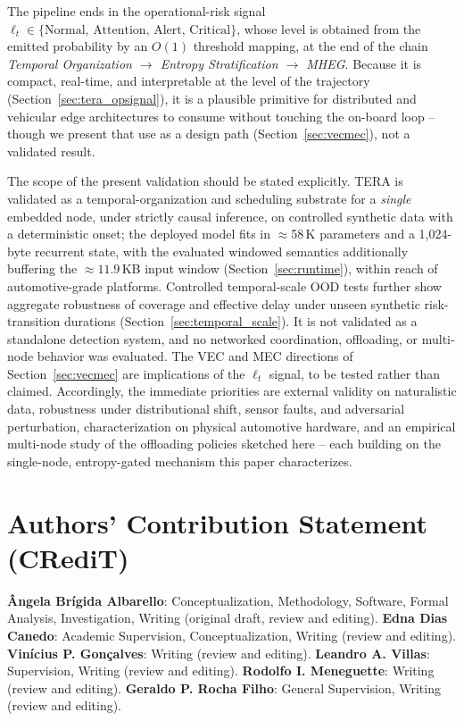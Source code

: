 \documentclass[a4paper,fleqn]{cas-dc}
\begin{document}
The pipeline ends in the operational-risk signal
$\ell_t \in \{\text{Normal},\, \text{Attention},\, \text{Alert},\, \text{Critical}\}$,
{\color{\revcolor}whose level is obtained from the emitted probability by an
$O(1)$ threshold mapping, at the end of the chain} \emph{Temporal Organization
$\rightarrow$ Entropy Stratification $\rightarrow$ MHEG}. Because it is compact, real-time, and
interpretable at the level of the trajectory (Section~\ref{sec:tera_opsignal}), it is
a plausible primitive for distributed and vehicular edge architectures to consume
without touching the on-board loop -- though we present that use as a design path
(Section~\ref{sec:vecmec}), not a validated result.

The scope of the present validation should be stated explicitly. TERA is validated
as a temporal-organization and scheduling substrate for a \emph{single} embedded
node, under strictly causal inference, on controlled synthetic data with a
deterministic onset; the deployed model fits in $\approx$58\,K parameters and a
1{,}024-byte recurrent state{\color{\revcolor}, with the evaluated windowed
semantics additionally buffering the ${\approx}11.9$\,KB input window
(Section~\ref{sec:runtime})}, within reach of automotive-grade platforms.
{\color{\revcolor}Controlled temporal-scale OOD tests further show aggregate
robustness of coverage and effective delay under unseen synthetic
risk-transition durations (Section~\ref{sec:temporal_scale}).}
It is not validated as a standalone detection system, and no networked coordination,
offloading, or multi-node behavior was evaluated. The VEC and MEC directions of
Section~\ref{sec:vecmec} are implications of the $\ell_t$ signal, to be tested rather
than claimed. Accordingly, the immediate priorities are external validity on
naturalistic data, robustness under distributional shift, sensor faults, and
adversarial perturbation, characterization on physical automotive hardware, and an
empirical multi-node study of the offloading policies sketched here -- each building
on the single-node, entropy-gated mechanism this paper characterizes.
\section*{Authors' Contribution Statement (CRediT)}
\textbf{{\^A}ngela Br\'igida Albarello}: Conceptualization, Methodology,
Software, Formal Analysis, Investigation, Writing (original draft, review
and editing).
\textbf{Edna Dias Canedo}: Academic Supervision, Conceptualization,
Writing (review and editing).
\textbf{Vin\'icius P. Gon\c{c}alves}: Writing (review and editing).
\textbf{Leandro A. Villas}: Supervision, Writing (review and editing).
\textbf{Rodolfo I. Meneguette}: Writing (review and editing).
\textbf{Geraldo P. Rocha Filho}: General Supervision, Writing (review
and editing).
\end{document}
